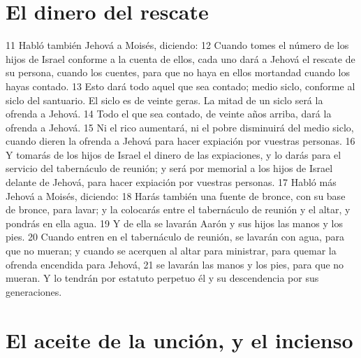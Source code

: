 \section*{El dinero del rescate}

11 Habló también Jehová a Moisés, diciendo:
12 Cuando tomes el número de los hijos de Israel conforme a la cuenta de ellos, cada uno dará a Jehová el rescate de su persona, cuando los cuentes, para que no haya en ellos mortandad cuando los hayas contado.
13 Esto dará todo aquel que sea contado; medio siclo,  conforme al siclo del santuario. El siclo es de veinte geras. La mitad de un siclo será la ofrenda a Jehová.
14 Todo el que sea contado, de veinte años arriba, dará la ofrenda a Jehová.
15 Ni el rico aumentará, ni el pobre disminuirá del medio siclo,  cuando dieren la ofrenda a Jehová para hacer expiación por vuestras personas.
16 Y tomarás de los hijos de Israel el dinero de las expiaciones, y lo darás para el servicio del tabernáculo de reunión; y será por memorial a los hijos de Israel delante de Jehová, para hacer expiación por vuestras personas.
17 Habló más Jehová a Moisés, diciendo:
18 Harás también una fuente de bronce, con su base de bronce, para lavar; y la colocarás entre el tabernáculo de reunión y el altar, y pondrás en ella agua.
19 Y de ella se lavarán Aarón y sus hijos las manos y los pies.
20 Cuando entren en el tabernáculo de reunión, se lavarán con agua, para que no mueran; y cuando se acerquen al altar para ministrar, para quemar la ofrenda encendida para Jehová,
21 se lavarán las manos y los pies, para que no mueran. Y lo tendrán por estatuto perpetuo él y su descendencia por sus generaciones.

\section*{El aceite de la unción, y el incienso}

